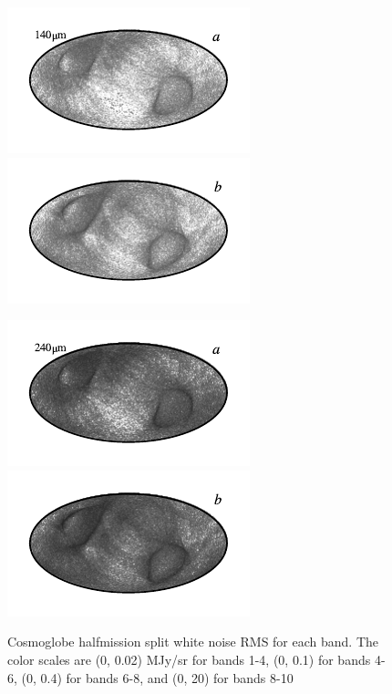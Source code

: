 \documentclass{aa}
\begin{document}
\begin{figure}
	\includegraphics{figs/rms_maps/rms_09a_c0001_000019.pdf}\includegraphics{figs/rms_maps/rms_09b_c0001_000019.pdf}
  \vspace*{-0.85cm}

	\includegraphics{figs/rms_maps/rms_10a_c0001_000019.pdf}\includegraphics{figs/rms_maps/rms_10b_c0001_000019.pdf}
  \vspace*{-0.85cm}

	\caption{Cosmoglobe halfmission split white noise RMS for each band. The color scales are (0, 0.02) MJy/sr for bands 1-4, (0, 0.1) for bands 4-6, (0, 0.4) for bands 6-8, and (0, 20) for bands 8-10}
	\label{fig:rms}
\end{figure}
\end{document}
